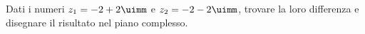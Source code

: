  	Dati i numeri $z_1=-2+2\uimm$ e $z_2=-2-2\uimm$, trovare la loro differenza e  disegnare il risultato  nel piano complesso.
 	\begin{center}
 		
 		\label{fig:disegnopianocomplesso08}
 	\end{center}
 
